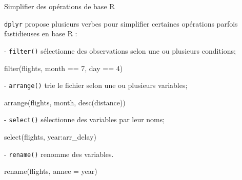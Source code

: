 \documentclass[12pt,handout,ignorenonframetext,]{beamer}
\newenvironment{Shaded}{}{}
\newcommand{\KeywordTok}[1]{\textcolor[rgb]{0.00,0.00,1.00}{#1}}
\newcommand{\DataTypeTok}[1]{#1}
\newcommand{\DecValTok}[1]{#1}
\newcommand{\StringTok}[1]{\textcolor[rgb]{0.00,0.50,0.50}{#1}}
\newcommand{\OperatorTok}[1]{#1}
\newcommand{\NormalTok}[1]{#1}
\renewenvironment{Shaded}{\begin{snugshade}}{\end{snugshade}}
\begin{document}
\begin{frame}[fragile]{Simplifier des opérations de base R}

\texttt{dplyr} propose plusieurs verbes pour simplifier certaines
opérations parfois fastidieuses en base R :

\pause \vspace{-1mm} - \texttt{filter()} sélectionne des observations
selon une ou plusieurs conditions;

\vspace{-3mm}

\begin{Shaded}
\begin{Highlighting}[]
\KeywordTok{filter}\NormalTok{(flights, month }\OperatorTok{==}\StringTok{ }\DecValTok{7}\NormalTok{, day }\OperatorTok{==}\StringTok{ }\DecValTok{4}\NormalTok{)}
\end{Highlighting}
\end{Shaded}

\pause \vspace{-3mm} - \texttt{arrange()} trie le fichier selon une ou
plusieurs variables;

\vspace{-3mm}

\begin{Shaded}
\begin{Highlighting}[]
\KeywordTok{arrange}\NormalTok{(flights, month, }\KeywordTok{desc}\NormalTok{(distance))}
\end{Highlighting}
\end{Shaded}

\pause \vspace{-3mm} - \texttt{select()} sélectionne des variables par
leur noms;

\vspace{-3mm}

\begin{Shaded}
\begin{Highlighting}[]
\KeywordTok{select}\NormalTok{(flights, year}\OperatorTok{:}\NormalTok{arr_delay)}
\end{Highlighting}
\end{Shaded}

\pause \vspace{-3mm} - \texttt{rename()} renomme des variables.

\vspace{-3mm}

\begin{Shaded}
\begin{Highlighting}[]
\KeywordTok{rename}\NormalTok{(flights, }\DataTypeTok{annee =}\NormalTok{ year)}
\end{Highlighting}
\end{Shaded}

\end{frame}
\end{document}
